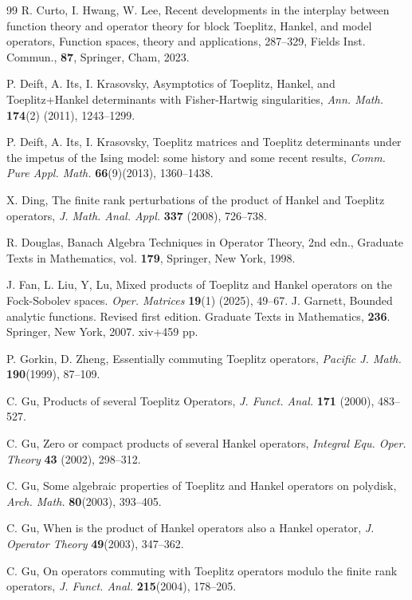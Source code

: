 \documentclass{article}%
\begin{document}
\begin{thebibliography}{99}
R. Curto, I. Hwang, W. Lee, Recent developments in
the interplay between function theory and operator theory for block Toeplitz,
Hankel, and model operators, Function spaces, theory and applications,
287--329, Fields Inst. Commun., \textbf{87}, Springer, Cham, 2023.

P. Deift, A. Its, I. Krasovsky, Asymptotics of Toeplitz,
Hankel, and Toeplitz+Hankel determinants with Fisher-Hartwig singularities,
\textsl{Ann. Math.} \textbf{174}(2) (2011), 1243--1299.

P. Deift, A. Its, I. Krasovsky, Toeplitz matrices and Toeplitz
determinants under the impetus of the Ising model: some history and some
recent results, \textsl{Comm. Pure Appl. Math.} \textbf{66}(9)(2013), 1360--1438.

X. Ding, The finite rank perturbations of the product of Hankel
and Toeplitz operators, \textsl{J. Math. Anal. Appl.} \textbf{337} (2008), 726--738.

R. Douglas, Banach Algebra Techniques in Operator Theory,
2nd edn., Graduate Texts in Mathematics, vol. \textbf{179}, Springer, New
York, 1998.

 J. Fan, L. Liu, Y, Lu,  Mixed products of Toeplitz and Hankel operators on the Fock-Sobolev spaces. \textsl{Oper. Matrices} \textbf{19}(1) (2025), 49--67.
J. Garnett, Bounded analytic functions. Revised first
edition. Graduate Texts in Mathematics, \textbf{236}. Springer, New York,
2007. xiv+459 pp.

P. Gorkin, D. Zheng, Essentially commuting Toeplitz
operators, \textsl{Pacific J. Math.} \textbf{190}(1999), 87--109.

C. Gu, Products of several Toeplitz Operators, \textsl{J.
Funct. Anal.} \textbf{171} (2000), 483--527.

C. Gu, Zero or compact products of several Hankel operators,
\textsl{Integral Equ. Oper. Theory} \textbf{43} (2002), 298--312.

C. Gu, Some algebraic properties of Toeplitz and Hankel
operators on polydisk, \textsl{Arch. Math.} \textbf{80}(2003), 393--405.

C. Gu, When is the product of Hankel operators also a Hankel
operator, \textsl{J. Operator Theory} \textbf{49}(2003), 347--362.

C. Gu, On operators commuting with Toeplitz operators modulo
the finite rank operators, \textsl{J. Funct. Anal.} \textbf{215}(2004), 178--205.


\end{thebibliography}
\end{document}
